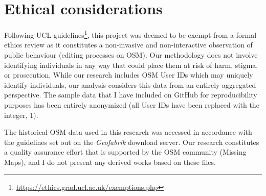 \section{Ethical considerations}

Following UCL guidelines\footnote{\url{https://ethics.grad.ucl.ac.uk/exemptions.php}}, this project was deemed to be exempt from a formal ethics review as it constitutes a non-invasive and non-interactive observation of public behaviour (editing processes on OSM). Our methodology does not involve identifying individuals in any way that could place them at risk of harm, stigma, or prosecution. While our research includes OSM User IDs which may uniquely identify individuals, our analysis considers this data from an entirely aggregated perspective. The sample data that I have included on GitHub for reproducibility purposes has been entirely anonymized (all User IDs have been replaced with the integer, 1). 

The historical OSM data used in this research was accessed in accordance with the guidelines set out on the \textit{Geofabrik} download server. Our research constitutes a quality assurance effort that is supported by the OSM community (Missing Maps), and I do not present any derived works based on these files. 


